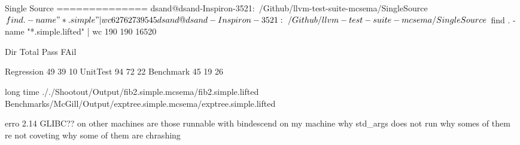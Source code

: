 Single Source
==============
dsand@dsand-Inspiron-3521:~/Github/llvm-test-suite-mcsema/SingleSource$ find . -name "*.simple" | wc 
    627     627   39545
dsand@dsand-Inspiron-3521:~/Github/llvm-test-suite-mcsema/SingleSource$ find . -name "*.simple.lifted" | wc 
    190     190   16520

Dir                     Total     Pass    FAil

Regression              49        39      10
UnitTest                94        72       22
Benchmark               45        19      26

long time
././Shootout/Output/fib2.simple.mcsema/fib2.simple.lifted
Benchmarks/McGill/Output/exptree.simple.mcsema/exptree.simple.lifted

erro 2.14 GLIBC?? on other machines
are those runnable with bindescend on my machine
why std_args does not run
why somes of them re not coveting
why some of them are chrashing

